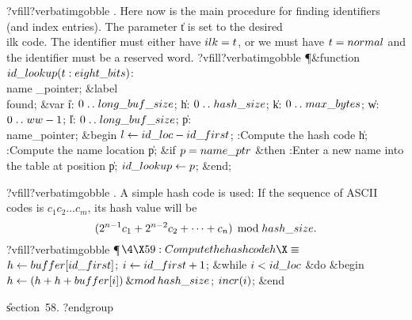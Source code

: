 \fi
?vfill?verbatimgobble
. Here now is the main procedure for finding identifiers (and index
entries).  The parameter \|t is set to the desired \\{ilk} code. The
identifier must either have $\\{ilk}=\|t$, or we must have
$\|t=\\{normal}$ and the identifier must be a reserved word.
?vfill?verbatimgobble
\Y\P\4\&{function}\1\  $\\{id\_lookup}(\|t:\\{eight\_bits})$: \\{name%
\_pointer};\6
\4\&{label} \\{found};\6
\4\&{var} \|i: $0\to\\{long\_buf\_size}$;\6
\|h: $0\to\\{hash\_size}$;\6
\|k: $0\to\\{max\_bytes}$;\6
\|w: $0\to\\{ww}-1$;\6
\|l: $0\to\\{long\_buf\_size}$;\6
\|p: \\{name\_pointer};\2\6
\&{begin} $\|l\K\\{id\_loc}-\\{id\_first}$;\6
:Compute the hash code \|h\X;\6
:Compute the name location \|p\X;\6
\&{if} $\|p=\\{name\_ptr}$ \1\&{then}\5
:Enter a new name into the table at position \|p\X;\2\6
$\\{id\_lookup}\K\|p$;\6
\&{end};\par
\fi
?vfill?verbatimgobble
. A simple hash code is used: If the sequence of
ASCII codes is $c_1c_2\ldots c_m$, its hash value will be
$$(2^{n-1}c_1+2^{n-2}c_2+\cdots+c_n)\,\bmod\,\\{hash\_size}.$$
?vfill?verbatimgobble
\Y\P$\4\X59:Compute the hash code \|h\X\S$\6
$\|h\K\\{buffer}[\\{id\_first}]$;\5
$\|i\K\\{id\_first}+1$;\6
\&{while} $\|i<\\{id\_loc}$ \1\&{do}\6
\&{begin} $\|h\K(\|h+\|h+\\{buffer}[\|i])\mathbin{\&{mod}}\\{hash\_size}$;\5
$\\{incr}(\|i)$;\6
\&{end}\2\par
\U section~58.\fi
?endgroup
\endgroup
\eject
\def\runninghead{APPENDIX C --- TRANSLATION BY {\tentt TANGLE}}
